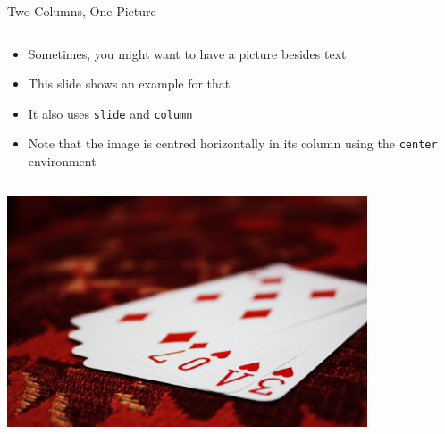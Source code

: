 \documentclass{ltusimple}
\begin{document}
\begin{slide}{Two Columns, One Picture}
	\begin{column}
		\begin{itemize}
			\item Sometimes, you might want to have a picture besides text
			\item This slide shows an example for that
			\item It also uses \texttt{slide} and \texttt{column}
			\item Note that the image is centred horizontally in its column using the \texttt{center} environment
		\end{itemize}
	\end{column}
	\begin{column}
		\begin{center}
			\includegraphics[width=0.8\textwidth]{template/example}
		\end{center}
	\end{column}
\end{slide}
\end{document}
